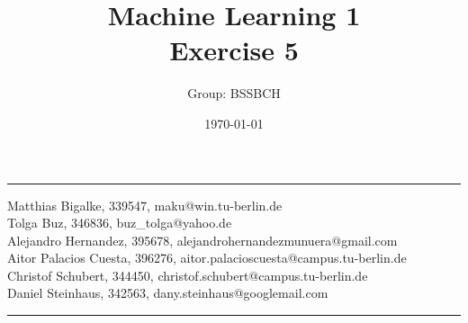 \documentclass{article}
\title{Machine Learning 1 \\ Exercise 5} %
\author{Group: BSSBCH} %
\date{\today} %
\begin{document}
\maketitle %
\noindent\rule[0.5ex]{\linewidth}{1pt}
Matthias Bigalke, 339547, maku@win.tu-berlin.de \\
Tolga Buz, 346836, buz\_tolga@yahoo.de \\
Alejandro Hernandez, 395678, alejandrohernandezmunuera@gmail.com \\
Aitor Palacios Cuesta, 396276, aitor.palacioscuesta@campus.tu-berlin.de \\
Christof Schubert, 344450, christof.schubert@campus.tu-berlin.de \\
Daniel Steinhaus, 342563, dany.steinhaus@googlemail.com\\
\noindent\rule[0.5ex]{\linewidth}{1pt}

\end{document}
